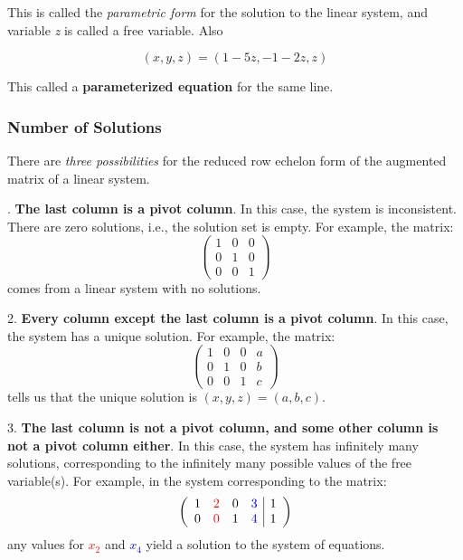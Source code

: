 \documentclass[a4paper,12pt]{article}
\begin{document}
\begin{frame}
    This is called the \textit{parametric form} for the solution to the linear system, and variable \textit{z} is called a free variable. Also

    \[(x,y,z) = (1-5z, -1-2z, z)\]

    This called a \textbf{parameterized equation} for the same line. 
    \end{frame}
\large \subsubsection{Number of Solutions}
    \begin{frame}
        \small
    
        \small There are \textit{three possibilities} for the reduced row echelon form of the augmented matrix of a linear system.

        . \textbf{The last column is a pivot column}. In this case, the system is inconsistent.  
        There are zero solutions, i.e., the solution set is empty. For example, the matrix:
        \[
        \left( \begin{array}{cc|c}
        1 & 0 & 0 \\
        0 & 1 & 0 \\
        0 & 0 & 1
        \end{array} \right)
        \]
        comes from a linear system with no solutions.

        2. \textbf{Every column except the last column is a pivot column}. In this case, the system has a unique solution. For example, the matrix:
        \[
        \left( \begin{array}{ccc|c}
        1 & 0 & 0 & a\\
        0 & 1 & 0 & b\\
        0 & 0 & 1 & c
        \end{array} \right)
        \]
        tells us that the unique solution is \((x, y, z) = (a, b, c)\).

        3. \textbf{The last column is not a pivot column, and some other column is not a pivot column either}. In this case, the system has infinitely many solutions, corresponding to the infinitely many possible values of the free variable(s). For example, in the system corresponding to the matrix:
        \[
        \left( \begin{array}{cccc|c}
        1 & \textcolor{red}{2} & 0 & \textcolor{blue}{3} & 1\\
        0 & \textcolor{red}{0} & 1 & \textcolor{blue}{4} & 1
        \end{array} \right)
        \]
        any values for \textcolor{red}{\(x_2\)} and \textcolor{blue}{\(x_4\)} yield a solution to the system of equations.

    \end{frame}
    
\end{document}
